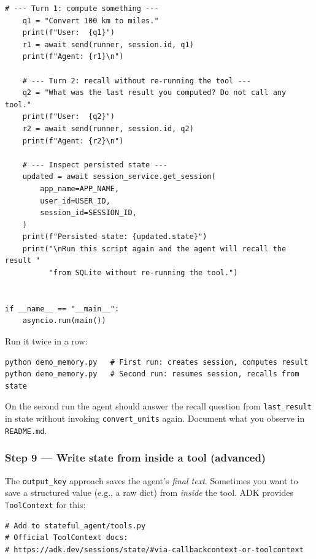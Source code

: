 \documentclass[12pt, a4paper]{article}
\begin{document}
\begin{practicalbox}
\begin{lstlisting}[style=pythonstyle, caption={day-3/demo\_memory.py --- demonstrate cross-restart recall}]
    # --- Turn 1: compute something ---
    q1 = "Convert 100 km to miles."
    print(f"User:  {q1}")
    r1 = await send(runner, session.id, q1)
    print(f"Agent: {r1}\n")

    # --- Turn 2: recall without re-running the tool ---
    q2 = "What was the last result you computed? Do not call any tool."
    print(f"User:  {q2}")
    r2 = await send(runner, session.id, q2)
    print(f"Agent: {r2}\n")

    # --- Inspect persisted state ---
    updated = await session_service.get_session(
        app_name=APP_NAME,
        user_id=USER_ID,
        session_id=SESSION_ID,
    )
    print(f"Persisted state: {updated.state}")
    print("\nRun this script again and the agent will recall the result "
          "from SQLite without re-running the tool.")


if __name__ == "__main__":
    asyncio.run(main())
\end{lstlisting}

Run it twice in a row:

\begin{lstlisting}[style=bashstyle]
python demo_memory.py   # First run: creates session, computes result
python demo_memory.py   # Second run: resumes session, recalls from state
\end{lstlisting}

On the second run the agent should answer the recall question from
\texttt{last\_result} in state without invoking \texttt{convert\_units} again.
Document what you observe in \texttt{README.md}.

\subsubsection*{Step 9 --- Write state from inside a tool (advanced)}

%

The \texttt{output\_key} approach saves the agent's \emph{final text}. Sometimes
you want to save a structured value (e.g., a raw dict) from \emph{inside} the
tool. ADK provides \texttt{ToolContext} for this:

\begin{lstlisting}[style=pythonstyle, caption={Saving structured data from inside a tool via ToolContext}]
# Add to stateful_agent/tools.py
# Official ToolContext docs:
# https://adk.dev/sessions/state/#via-callbackcontext-or-toolcontext


\end{lstlisting}
\end{practicalbox}
\end{document}
